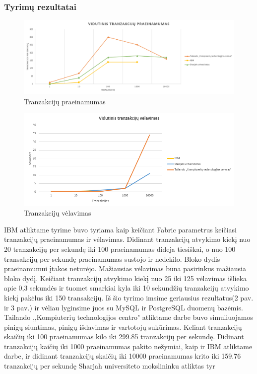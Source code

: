 \documentclass{VUMIFPSkursinis}
\begin{document}
		\subsubsection{Tyrimų rezultatai}
\begin{figure}[H]
    \centering
    \includegraphics[scale=0.5]{img/Praein}
    \caption{Tranzakcijų praeinamumas}   %
    \label{img:mlp}
\end{figure}		
\begin{figure}[H]
    \centering
    \includegraphics[scale=0.5]{img/Velav}
    \caption{Tranzakcijų vėlavimas}   %
    \label{img:mlp}
\end{figure}		

			IBM atliktame tyrime \cite{IMBResearch} buvo tyriama kaip keičiant Fabric parametrus keičiasi tranzakcijų praeinamumas ir vėlavimas. Didinant tranzakcijų atvykimo kiekį nuo 20 tranzakcijų per sekundę iki 100 praeinamumas dideja tiesiškai, o nuo 100 transakcijų per sekundę praeinamumas sustojo ir nedekilo. Bloko dydis praeinamumui įtakos neturėjo. 
\newline
Mažiausias vėlavimas būna pasirinkus mažiausia bloko dydį. Keičiant tranzakcijų atvykimo kiekį nuo 25 iki 125 vėlavimas išlieka apie 0,3 sekundės ir tuomet smarkiai kyla iki 10 sekundžių tranzakcijų 
atvykimo kiekį pakėlus iki 150 transakcijų. 
\newline
Iš šio tyrimo imsime geriausius rezultatus(2 pav. ir 3 pav.) ir vėliau lyginsime juos su MySQL ir PostgreSQL duomenų bazėmis. 
			Tailando ,,Kompiuterių technologijos centro" atliktame darbe buvo simuliuojamos pinigų siuntimas, pinigų išdavimas ir vartotojų sukūrimas. Keliant tranzakcijų skaičių iki 100 praeinamumas kilo iki 299.85 tranzakcijų per sekundę. Didinant tranzakcijų kaičių iki 1000 praeinamumas pakito nežymiai, kaip ir IBM \cite{IMBResearch} atliktame darbe, ir didinant tranzakcijų skaičių iki 10000 praeinamumas krito iki 159.76 tranzakcijų per sekundę
			Sharjah universiteto mokslininku atliktas tyr
\end{document}
